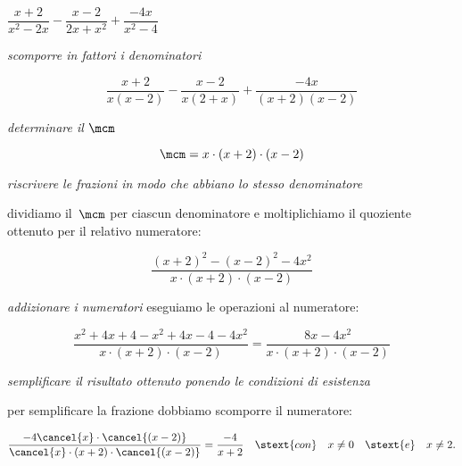 \begin{esempio}{}{}
\(\dfrac{x+2}{x^{2}-2x}-\dfrac{x-2}{2x+x^{2}}+\dfrac{-4x}{x^{2}-4}\)\\

\begin{enumeratea}
\item \emph{scomporre in fattori i denominatori}

\vspace{-1.2em}
\[\dfrac{x+2}{x(x-2)}-\dfrac{x-2}{x(2+x)}+\dfrac{-4x}{(x+2)(x-2)}\]

\item \emph{determinare il \(\mcm\)}

\vspace{-1.2em}
\[\mcm = x\cdot (x+2) \cdot (x-2)\]


\item \emph{riscrivere le frazioni in modo che abbiano lo stesso
denominatore}

dividiamo il~\(\mcm\) per ciascun denominatore e moltiplichiamo il 
quoziente ottenuto per il relativo numeratore:

\vspace{-1.2em}
\[\dfrac{(x+2)^{2}-(x-2)^{2}-4x^{2}}{x\cdot(x+2)\cdot(x-2)}\]
\item \emph{addizionare i numeratori} eseguiamo le operazioni al numeratore:

\vspace{-1.2em}
  \begin{equation*}
    \dfrac{x^{2}+4x+4-x^{2}+4x-4-4x^{2}}{x\cdot(x+2)\cdot(x-2)}=
    \dfrac{8x-4x^{2}}{x\cdot(x+2)\cdot(x-2)}
    \end{equation*}
\item \emph{semplificare il risultato ottenuto ponendo le condizioni di 
esistenza}

per semplificare la frazione dobbiamo scomporre il numeratore:

\vspace{-1.2em}
  \begin{equation*}
  \dfrac{-4\cancel{x}\cdot\cancel{(x-2)}}
        {\cancel{x}\cdot(x+2)\cdot\cancel{(x-2)}}=
  \dfrac{-4}{x+2} \quad  \stext{con} \quad x \neq 0 \quad  \stext{e} \quad x 
\neq 2.
  \end{equation*}
\end{enumeratea}
\end{esempio}

